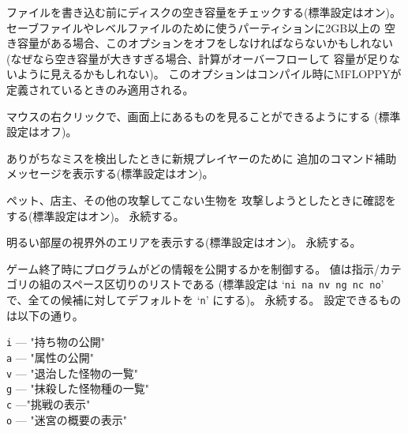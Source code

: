 ファイルを書き込む前にディスクの空き容量をチェックする(標準設定はオン)。
セーブファイルやレベルファイルのために使うパーティションに2GB以上の
空き容量がある場合、このオプションをオフをしなければならないかもしれない
(なぜなら空き容量が大きすぎる場合、計算がオーバーフローして
容量が足りないように見えるかもしれない)。
このオプションはコンパイル時にMFLOPPYが定義されているときのみ適用される。
\item[\ib{clicklook}]
マウスの右クリックで、画面上にあるものを見ることができるようにする
(標準設定はオフ)。
\item[\ib{cmdassist}]
ありがちなミスを検出したときに新規プレイヤーのために
追加のコマンド補助メッセージを表示する(標準設定はオン)。
\item[\ib{confirm}]
ペット、店主、その他の攻撃してこない生物を
攻撃しようとしたときに確認をする(標準設定はオン)。
永続する。
\item[\ib{dark\verb+_+room}]
明るい部屋の視界外のエリアを表示する(標準設定はオン)。
永続する。
\item[\ib{disclose}]
ゲーム終了時にプログラムがどの情報を公開するかを制御する。
値は指示/カテゴリの組のスペース区切りのリストである
(標準設定は `{\tt ni na nv ng nc no}' で、全ての候補に対してデフォルトを
`{\tt n}' にする)。
永続する。
設定できるものは以下の通り。

{\tt i} --- "持ち物の公開"\\
{\tt a} --- "属性の公開"\\
{\tt v} --- "退治した怪物の一覧"\\
{\tt g} --- "抹殺した怪物種の一覧"\\
{\tt c} ---"挑戦の表示"\\
{\tt o} --- "迷宮の概要の表示"

